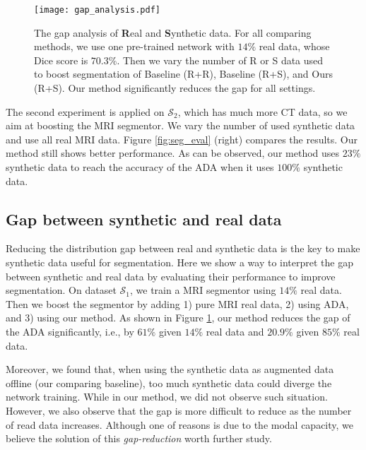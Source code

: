 \documentclass[10pt,twocolumn,letterpaper]{article}
\begin{document}
\begin{figure}[t]
	\begin{center}
		\texttt{[image: gap\_analysis.pdf]}
	\end{center}
	\vspace{-.4cm}
	\caption{The gap analysis of \textbf{R}eal and \textbf{S}ynthetic data. For all comparing methods, we use one pre-trained network with $14\%$ real data, whose Dice score is $70.3\%$. Then we vary the number of R or S data used to boost segmentation of Baseline (R+R),  Baseline (R+S), and Ours (R+S).  Our method significantly reduces the gap for all settings.} \label{fig:gap} 
\end{figure}

The second experiment is applied on $\mathcal{S}_2$, which has much more CT data, so we aim at boosting the MRI segmentor. We vary the number of used synthetic data and use all real MRI data. Figure \ref{fig:seg_eval} (right) compares the results.  Our method still shows better performance. As can be observed, our method uses $23\%$ synthetic data to reach the accuracy of the ADA when it uses $100\%$ synthetic data. 


\vspace{-.2cm}
\subsection{Gap between synthetic and real data}
Reducing the distribution gap between real and synthetic data is the key to make synthetic data useful for segmentation. 
Here we show a way to interpret the gap between synthetic and real data by evaluating their performance to improve segmentation. On dataset $\mathcal{S}_1$,
we train a MRI segmentor using $14\%$ real data. Then we boost the segmentor by adding 1) pure MRI real data, 2) using ADA, and 3) using our method. 
As shown in Figure \ref{fig:gap}, our method reduces the gap of the ADA significantly, i.e., by $61\%$ given $14\%$ real data and $20.9\%$ given $85\%$ real data.

Moreover, we found that, when using the synthetic data as augmented data offline (our comparing baseline), too much synthetic data could diverge the network training. While in our method, we did not observe such situation. However, we also observe that the gap is more difficult to reduce as the number of read data increases. Although one of reasons is due to the modal capacity, we believe the solution of this \textit{gap-reduction} worth further study. 
\end{document}
